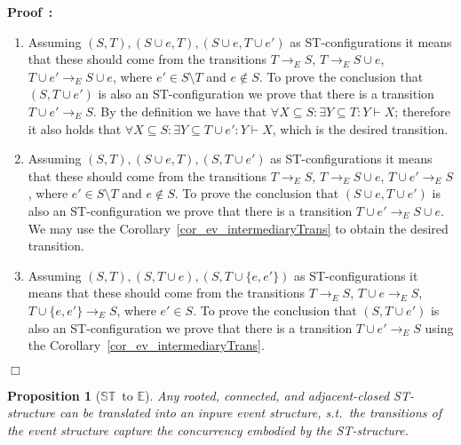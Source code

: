 \documentclass[submission,copyright,creativecommons]{eptcs}
\newtheorem{proposition}[theorem]{Proposition}
\newenvironment{proof}[1][\!\!\,]{\vspace{1ex}\noindent\textbf{Proof #1: }}{\hfill$\Box$\vspace{2ex}}
\newcommand\allST{\ensuremath{\mathbb{ST}}}
\newcommand\allEv{\ensuremath{\mathbb{E}}}
\newcommand\stepTransEvGlabbeek{\ensuremath{\rightarrow_{E}}}
\newcommand\enableRelEv{\ensuremath{\vdash}}
\begin{document}
\begin{proof}
\begin{enumerate}
\item Assuming $(S,T),(S\cup e,T),(S\cup e,T\cup e')$ as ST-configurations it means that these should come from the transitions $T\stepTransEvGlabbeek S$, $T\stepTransEvGlabbeek S\cup e$, $T\cup e'\stepTransEvGlabbeek S\cup e$, where $e'\in S\setminus T$ and $e\not\in S$. To prove the conclusion that $(S,T\cup e')$ is also an ST-configuration we prove that there is a transition $T\cup e'\stepTransEvGlabbeek S$. By the definition we have that $\forall X\subseteq S:\exists Y\subseteq T:Y\enableRelEv X$; therefore it also holds that $\forall X\subseteq S:\exists Y\subseteq T\cup e':Y\enableRelEv X$, which is the desired transition.

\item Assuming $(S,T),(S\cup e,T),(S,T\cup e')$ as ST-configurations it means that these should come from the transitions $T\stepTransEvGlabbeek S$, $T\stepTransEvGlabbeek S\cup e$, $T\cup e'\stepTransEvGlabbeek S$, where $e'\in S\setminus T$ and $e\not\in S$. To prove the conclusion that $(S\cup e,T\cup e')$ is also an ST-configuration we prove that there is a transition $T\cup e'\stepTransEvGlabbeek S\cup e$. 
We may use the Corollary~\ref{cor_ev_intermediaryTrans} to obtain the desired transition.

\item Assuming $(S,T),(S,T\cup e),(S,T\cup \{e,e'\})$ as ST-configurations it means that these should come from the transitions $T\stepTransEvGlabbeek S$, $T\cup e\stepTransEvGlabbeek S$, $T\cup \{e,e'\}\stepTransEvGlabbeek S$, where $e'\in S$. To prove the conclusion that $(S,T\cup e')$ is also an ST-configuration we prove that there is a transition $T\cup e'\stepTransEvGlabbeek S$ using the Corollary~\ref{cor_ev_intermediaryTrans}.
\end{enumerate}
\end{proof}



\begin{proposition}[\allST\ to \allEv]\label{prop_st_to_ev}
Any rooted, connected, and adjacent-closed ST-structure can be translated into an inpure event structure, s.t.\ the transitions of the event structure capture the concurrency embodied by the ST-structure.
\end{proposition}
\end{document}
